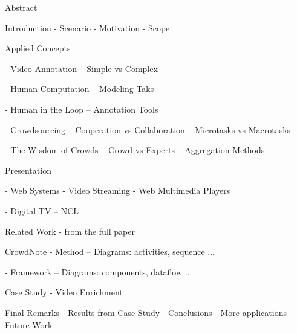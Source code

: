 Abstract

Introduction
- Scenario
- Motivation
- Scope

Applied Concepts

- Video Annotation
-- Simple vs Complex

- Human Computation
-- Modeling Taks

- Human in the Loop
-- Annotation Tools

- Crowdsourcing
-- Cooperation vs Collaboration
-- Microtasks vs Macrotasks

- The Wisdom of Crowds
-- Crowd vs Experts
-- Aggregation Methods

Presentation

- Web Systems
- Video Streaming
- Web Multimedia Players

- Digital TV
-- NCL

Related Work
- from the full paper

CrowdNote 
- Method
-- Diagrams: activities, sequence ...

- Framework
-- Diagrams: components, dataflow ...

Case Study
- Video Enrichment

Final Remarks
- Results from Case Study
- Conclusions
- More applications
- Future Work








